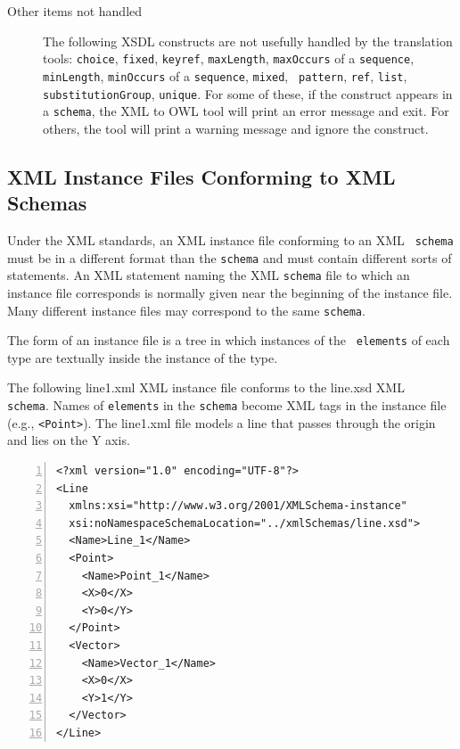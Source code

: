 \documentclass[preprint,12pt]{elsarticle}
\newenvironment{mylisting}
{\begin{list}{}{\setlength{\leftmargin}{1em}}\item\small}
{\end{list}}
\begin{document}
\begin{description}
\item [Other items not handled] The following XSDL constructs are not
  usefully handled by the translation tools: {\tt choice}, {\tt fixed},
  {\tt keyref}, {\tt maxLength}, {\tt maxOccurs} of a {\tt sequence}, {\tt
    minLength}, {\tt minOccurs} of a {\tt sequence}, {\tt mixed}, {\tt
    pattern}, {\tt ref}, {\tt list}, {\tt substitutionGroup}, {\tt unique}.
  For some of these, if the construct appears in a {\tt schema}, the XML to
  OWL tool will print an error message and exit. For others, the tool will
  print a warning message and ignore the construct.
\end{description}

\subsection{XML Instance Files Conforming to XML Schemas}
\label{xmlInstanceFiles}

Under the XML standards, an XML instance file conforming to an XML {\tt
  schema} must be in a different format than the {\tt schema} and must
contain different sorts of statements. An XML statement naming the XML
{\tt schema} file to which an instance file corresponds is normally given
near the beginning of the instance file. Many different instance files may
correspond to the same {\tt schema}.

The form of an instance file is a tree in which instances of the {\tt
  elements} of each type are textually inside the instance of the type.

The following line1.xml XML instance file conforms to the line.xsd XML {\tt
  schema}. Names of {\tt elements} in the {\tt schema} become XML tags in
the instance file (e.g., {\tt <Point>}). The line1.xml file models a line
that passes through the origin and lies on the Y axis.

\begin{mylisting}
\begin{Verbatim}[commandchars=\\\{\},numbers=left, numbersep=1pt]
<?xml version="1.0" encoding="UTF-8"?>
<Line
  xmlns:xsi="http://www.w3.org/2001/XMLSchema-instance"
  xsi:noNamespaceSchemaLocation="../xmlSchemas/line.xsd">
  <Name>Line_1</Name>
  <Point>
    <Name>Point_1</Name>
    <X>0</X>
    <Y>0</Y>
  </Point>
  <Vector>
    <Name>Vector_1</Name>
    <X>0</X>
    <Y>1</Y>
  </Vector>
</Line>
\end{Verbatim}
\label{xmlInstance}
\end{mylisting}
\end{document}
